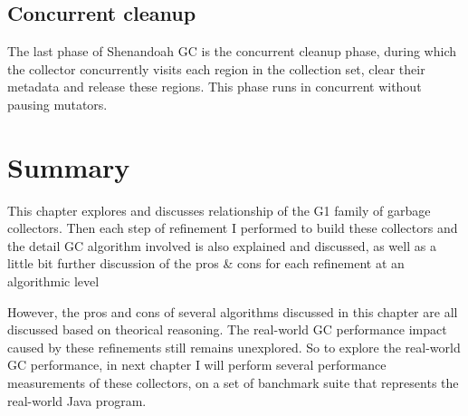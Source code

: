 \subsection{Concurrent cleanup}

The last phase of Shenandoah GC is the concurrent cleanup phase, during which the
collector concurrently visits each region in the collection set, clear their metadata
and release these regions. This phase runs in concurrent without pausing mutators.



\section{Summary}

This chapter explores and discusses relationship of the G1 family of garbage collectors.
Then each step of refinement I performed to build these collectors and the detail GC algorithm involved
is also explained and discussed, as well as a little bit further discussion of the
pros \& cons for each refinement at an algorithmic level

However, the pros and cons of several algorithms discussed in this chapter are
all discussed based on theorical reasoning.
The real-world GC performance impact caused by these refinements still remains unexplored.
So to explore the real-world GC performance, in next chapter I will perform several performance
measurements of these collectors, on a set of banchmark suite that represents the
real-world Java program.


